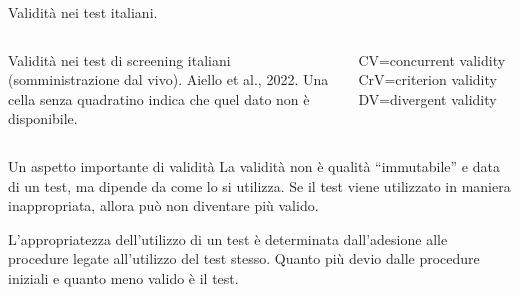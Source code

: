 \documentclass[
  ignorenonframetext,
]{beamer}
\begin{document}
\begin{frame}{Validità nei test italiani.}
\begin{columns}
Validità nei test di screening italiani (somministrazione dal vivo).
Aiello et al., 2022. Una cella senza quadratino indica che quel dato non è disponibile.

\vspace{2em}

CV=concurrent validity
CrV=criterion validity
DV=divergent validity

\end{columns}
\end{frame}

\begin{frame}{Un aspetto importante di validità}
\label{un-aspetto-importante-di-validituxe0}
La validità non è qualità ``immutabile'' e data di un test, ma dipende
da come lo si utilizza. Se il test viene utilizzato in maniera
inappropriata, allora può non diventare più valido.

L'appropriatezza dell'utilizzo di un test è determinata dall'adesione
alle procedure legate all'utilizzo del test stesso. Quanto più devio
dalle procedure iniziali e quanto meno valido è il test.
\end{frame}
\end{document}
